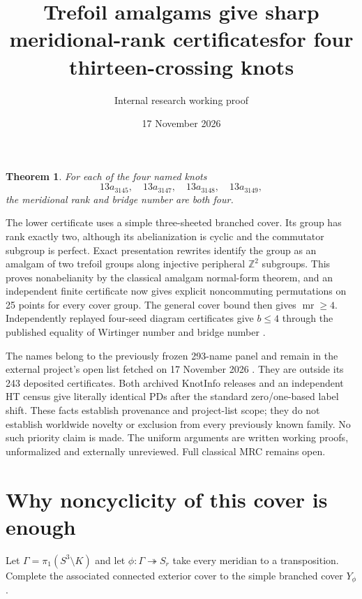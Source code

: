 \documentclass[11pt]{article}
\title{Trefoil amalgams give sharp meridional-rank certificates\newline for four thirteen-crossing knots}
\author{Internal research working proof}
\date{17 November 2026}
\newtheorem{theorem}{Theorem}
\newcommand{\Z}{\mathbb Z}
\newcommand{\mr}{\operatorname{mr}}
\begin{document}
\maketitle

\begin{theorem}\label{thm:knots}
For each of the four named knots
\[
                  13a_{3145},\quad13a_{3147},\quad
                  13a_{3148},\quad13a_{3149},
\]
the meridional rank and bridge number are both four.
\end{theorem}

The lower certificate uses a simple three-sheeted branched cover.
Its group has rank exactly two, although its abelianization is
cyclic and the commutator subgroup is perfect. Exact presentation
rewrites identify the group as an amalgam of two trefoil groups
along injective peripheral $\Z^2$ subgroups. This proves
nonabelianity by the classical amalgam normal-form theorem,
and an independent finite certificate now gives explicit
noncommuting permutations on 25 points for every cover group.
The general cover bound then gives $\mr\ge4$. Independently
replayed four-seed diagram certificates give $b\le4$ through
the published equality of Wirtinger number and bridge number
\cite{wirt}.

The names belong to the previously frozen 293-name panel and
remain in the external project's open list fetched on
17 November 2026 \cite{deposit}. They are outside its 243
deposited certificates. Both archived KnotInfo releases and an
independent HT census give literally identical PDs after the
standard zero/one-based label shift. These facts establish
provenance and project-list scope; they do not establish
worldwide novelty or exclusion from every previously known
family. No such priority claim is made. The uniform arguments
are written working proofs, unformalized and externally
unreviewed. Full classical MRC remains open.

\section{Why noncyclicity of this cover is enough}

Let $\Gamma=\pi_1(S^3\setminus K)$ and let
$\phi:\Gamma\twoheadrightarrow S_r$ take every meridian to a
transposition. Complete the associated connected exterior cover
to the simple branched cover $Y_\phi$.
\end{document}
